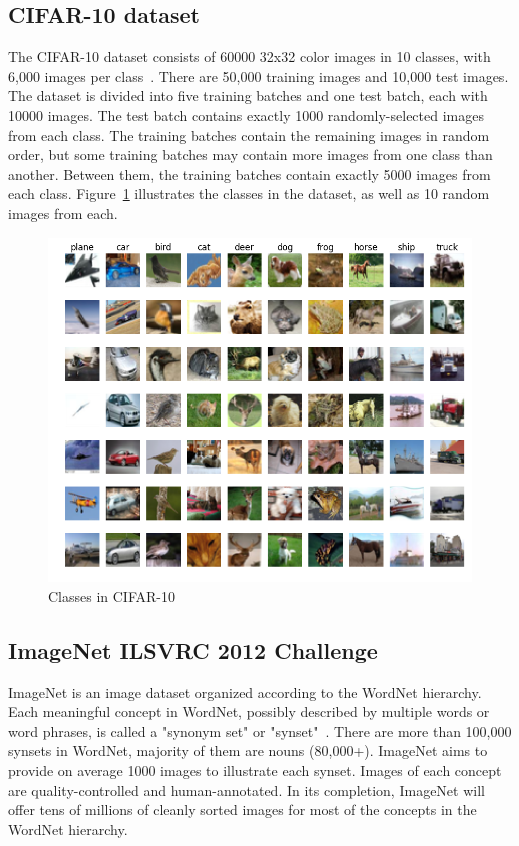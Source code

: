 \subsection{CIFAR-10 dataset}
The CIFAR-10 dataset consists of 60000 32x32 color images in 10 classes, with 
6,000 images per class~\cite{cifar10}. There are 50,000 training images and 
10,000 test images. The dataset is divided into five training batches and one 
test batch, each with 10000 images. The test batch contains exactly 1000 
randomly-selected images from each class. The training batches contain the 
remaining images in random order, but some training batches may contain more 
images from one class than another.  Between them, the training batches contain 
exactly 5000 images from each class. Figure~\ref{fig:cifar10} illustrates the 
classes in the dataset, as well as 10 random images from each.
\begin{figure}[H]
    \centerline{\includegraphics[scale=0.40]{methodology/figs/cifar10.png}}
    \caption{Classes in CIFAR-10}
    \label{fig:cifar10}
\end{figure}

\subsection{ImageNet ILSVRC 2012 Challenge}
ImageNet is an image dataset organized according to the WordNet hierarchy. Each 
meaningful concept in WordNet, possibly described by multiple words or word 
phrases, is called a "synonym set" or "synset"~\cite{imagenet}. There are more 
than 100,000 synsets in WordNet, majority of them are nouns (80,000+). ImageNet 
aims to provide on average 1000 images to illustrate each synset. Images of each 
concept are quality-controlled and human-annotated. In its completion, ImageNet 
will offer tens of millions of cleanly sorted images for most of the concepts in 
the WordNet hierarchy.

